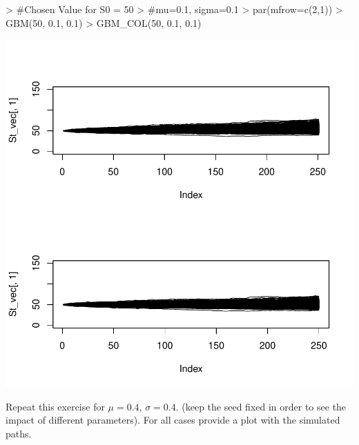 \documentclass{article}
\begin{document}
\begin{Schunk}
\begin{Sinput}
> #Chosen Value for S0 = 50
> #mu=0.1, sigma=0.1
> par(mfrow=c(2,1))
> GBM(50, 0.1, 0.1)
> GBM_COL(50, 0.1, 0.1)
\end{Sinput}
\end{Schunk}
\includegraphics{HW2_Ex_1-5_V02-002}


Repeat this exercise for $\mu = 0.4$, $\sigma = 0.4$. (keep
the seed fixed in order to see the impact of different parameters). For all cases provide a plot with the simulated paths.
\end{document}
